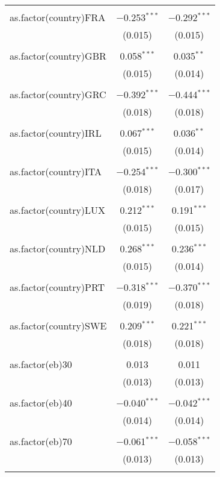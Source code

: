 \begin{table}[!htbp]
\begin{tabular}{@{\extracolsep{5pt}}lcc}
  & & \\ 
 as.factor(country)FRA & $-$0.253$^{***}$ & $-$0.292$^{***}$ \\ 
  & (0.015) & (0.015) \\ 
  & & \\ 
 as.factor(country)GBR & 0.058$^{***}$ & 0.035$^{**}$ \\ 
  & (0.015) & (0.014) \\ 
  & & \\ 
 as.factor(country)GRC & $-$0.392$^{***}$ & $-$0.444$^{***}$ \\ 
  & (0.018) & (0.018) \\ 
  & & \\ 
 as.factor(country)IRL & 0.067$^{***}$ & 0.036$^{**}$ \\ 
  & (0.015) & (0.014) \\ 
  & & \\ 
 as.factor(country)ITA & $-$0.254$^{***}$ & $-$0.300$^{***}$ \\ 
  & (0.018) & (0.017) \\ 
  & & \\ 
 as.factor(country)LUX & 0.212$^{***}$ & 0.191$^{***}$ \\ 
  & (0.015) & (0.015) \\ 
  & & \\ 
 as.factor(country)NLD & 0.268$^{***}$ & 0.236$^{***}$ \\ 
  & (0.015) & (0.014) \\ 
  & & \\ 
 as.factor(country)PRT & $-$0.318$^{***}$ & $-$0.370$^{***}$ \\ 
  & (0.019) & (0.018) \\ 
  & & \\ 
 as.factor(country)SWE & 0.209$^{***}$ & 0.221$^{***}$ \\ 
  & (0.018) & (0.018) \\ 
  & & \\ 
 as.factor(eb)30 & 0.013 & 0.011 \\ 
  & (0.013) & (0.013) \\ 
  & & \\ 
 as.factor(eb)40 & $-$0.040$^{***}$ & $-$0.042$^{***}$ \\ 
  & (0.014) & (0.014) \\ 
  & & \\ 
 as.factor(eb)70 & $-$0.061$^{***}$ & $-$0.058$^{***}$ \\ 
  & (0.013) & (0.013) \\ 
  & & \\ 

\end{tabular}
\end{table}
